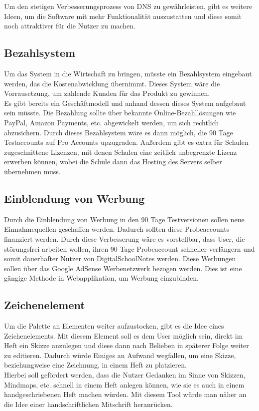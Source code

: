Um den stetigen Verbesserungsprozess von DNS zu gewährleisten, gibt es weitere Ideen, um die Software mit mehr Funktionalität auszustatten und diese somit noch attraktiver für die Nutzer zu machen. 
\subsection{Bezahlsystem}
Um das System in die Wirtschaft zu bringen, müsste ein Bezahlsystem eingebaut werden, das die Kostenabwicklung übernimmt. Dieses System wäre die Vorrausetzung, um zahlende Kunden für das Produkt zu gewinnen.\\
Es gibt bereits ein Geschäftmodell und anhand dessen dieses System aufgebaut sein müsste. 
Die Bezahlung sollte über bekannte Online-Bezahllösungen wie PayPal, Amazon Payments, etc. abgewickelt werden, um sich rechtlich abzusichern. Durch dieses Bezahlsystem wäre es dann möglich, die 90 Tage Testaccounts auf Pro Accounts upzugraden. Außerdem gibt es extra für Schulen zugeschnittene Lizenzen, mit denen Schulen eine zeitlich unbegrenzte Lizenz erwerben können, wobei die Schule dann das Hosting des Servers selber übernehmen muss. 
\subsection{Einblendung von Werbung}
Durch die Einblendung von Werbung in den 90 Tage Testversionen sollen neue Einnahmequellen geschaffen werden. Dadurch sollten diese Probeaccounts finanziert werden. Durch diese Verbesserung wäre es vorstellbar, dass User, die störungsfrei arbeiten wollen, ihren 90 Tage Probeaccount schneller verlängern und somit dauerhafter Nutzer von DigitalSchoolNotes werden. Diese Werbungen sollen über das Google AdSense Werbenetzwerk bezogen werden. Dies ist eine gängige Methode in Webapplikation, um Werbung einzubinden.
\subsection{Zeichenelement}
Um die Palette an Elementen weiter aufzustocken, gibt es die Idee eines Zeichenelements. Mit diesem Element soll es dem User möglich sein, direkt im Heft ein Skizze anzulegen und diese dann nach Belieben in späterer Folge weiter zu editieren. Dadurch würde Einiges an Aufwand wegfallen, um eine Skizze, beziehungweise eine Zeichnung, in einem Heft zu platzieren.\\
Hierbei soll gefördert werden, dass die Nutzer Gedanken im Sinne von Skizzen, Mindmaps, etc. schnell in einem Heft anlegen können, wie sie es auch in einem handgeschriebenen Heft machen würden. Mit diesem Tool würde man näher an die Idee einer handschriftlichen Mitschrift heranrücken.
